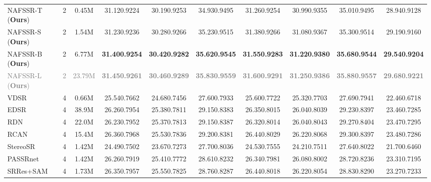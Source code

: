 \documentclass[10pt,twocolumn,letterpaper]{article}
\begin{document}
\begin{table*}[!t]
{\begin{tabular}{lccccccccc}
\midrule
NAFSSR-T (\textbf{Ours}) & 2 & 0.45M  & 31.120.9224	& 30.190.9253	 & 34.930.9495 & 31.260.9254& 30.990.9355 & 35.010.9495 & 28.940.9128\\
NAFSSR-S (\textbf{Ours}) & 2 & 1.54M  & 31.230.9236	& 30.280.9266	 & 35.230.9515 & 31.380.9266& 31.080.9367 & 35.300.9514 & 29.190.9160\\
NAFSSR-B (\textbf{Ours}) & 2 & 6.77M  & \textbf{31.40}\textbf{0.9254} & \textbf{30.42}\textbf{0.9282} & \textbf{35.62}\textbf{0.9545} & \textbf{31.55}\textbf{0.9283} & \textbf{31.22}\textbf{0.9380} & \textbf{35.68}\textbf{0.9544} & \textbf{29.54}\textbf{0.9204} \\
\textcolor{gray}{NAFSSR-L (\textbf{Ours})} & \textcolor{gray}{2} & \textcolor{gray}{23.79M}  & \textcolor{gray}{\textbf{31.45}}\textcolor{gray}{\textbf{0.9261}} & \textcolor{gray}{\textbf{30.46}}\textcolor{gray}{\textbf{0.9289}} & \textcolor{gray}{\textbf{35.83}}\textcolor{gray}{\textbf{0.9559}} & \textcolor{gray}{\textbf{31.60}}\textcolor{gray}{\textbf{0.9291}} & \textcolor{gray}{\textbf{31.25}}\textcolor{gray}{\textbf{0.9386}} & \textcolor{gray}{\textbf{35.88}}\textcolor{gray}{\textbf{0.9557}} & \textcolor{gray}{\textbf{29.68}}\textcolor{gray}{\textbf{0.9221}} \\
\midrule
\midrule
VDSR~\cite{kim2016accurate} &  4 & 0.66M & 25.540.7662 & 24.680.7456 & 27.600.7933 & 25.600.7722 & 25.320.7703 & 27.690.7941 & 22.460.6718 \\
EDSR~\cite{lim2017enhanced} &  4 & 38.9M & 26.260.7954 & 25.380.7811 & 29.15{0.8383} & 26.350.8015 & 26.040.8039 & 29.230.8397 & 23.460.7285 \\
RDN~\cite{zhang2018residual} &  4 & 22.0M  & 26.230.7952 & 25.370.7813 & 29.150.8387 & 26.320.8014 & 26.040.8043 & 29.27{0.8404} & 23.47{0.7295} \\
RCAN~\cite{zhang2018image} &  4 & 15.4M & 26.360.7968 & 25.530.7836 & {29.20}0.8381 & 26.440.8029 & 26.220.8068 & {29.30}0.8397 & {23.48}0.7286 \\
StereoSR~\cite{jeon2018enhancing}  &  4 & 1.42M   & 24.490.7502 & 23.670.7273 &27.700.8036 & 24.530.7555 & 24.210.7511 & 27.640.8022 & 21.700.6460 \\
PASSRnet~\cite{wang2019learning}  &  4 & 1.42M   & 26.260.7919 & 25.410.7772 &28.610.8232 & 26.340.7981 & 26.080.8002 & 28.720.8236 & 23.310.7195 \\
SRRes+SAM~\cite{ying2020stereo}  &  4 & 1.73M  & 26.350.7957 & 25.550.7825 & 28.760.8287 & 26.440.8018 & 26.220.8054 & 28.830.8290 & 23.270.7233 \\

\end{tabular}}
\end{table*}
\end{document}
